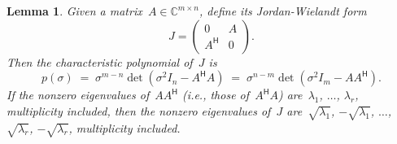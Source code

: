 \documentclass[11pt,a4paper]{article}
\newtheorem{lemma}{Lemma}%
\theoremstyle{definition}
\def\CC{\mathbb{C}}
\newcommand{\hmt}{{\scriptscriptstyle{{\mathsf{H}}}}}
\begin{document}
\begin{lemma}
  \label{lem:lanczos}
  Given a matrix~$A \in \CC^{m\times n}$, define its Jordan-Wielandt form~\cite{Mathias_2013}
\begin{equation}
  \label{eq:JW}
  J = 
  \begin{pmatrix}
    0 & A \\
    A^\hmt & 0
  \end{pmatrix}.
\end{equation}
 Then the characteristic polynomial of~$J$ is
    \begin{equation}
      \label{eq:chp}
      p(\sigma) \;=\; \sigma^{m-n}\det(\sigma^2 I_n - A^\hmt A) \;=\; \sigma^{n-m}\det(\sigma^2 I_m
      - A A^\hmt). 
    \end{equation}
    If the nonzero eigenvalues of~$AA^\hmt$ \textnormal{(}i.e., those of~$A^\hmt A$\textnormal{)}
    are~$\lambda_1$, $\dots$, $\lambda_r$, multiplicity included, then
    the nonzero eigenvalues of~$J$ are~$\sqrt{\lambda_1}$, $-\sqrt{\lambda_1}$, $\dots$, $\sqrt{\lambda_r}$,
    $-\sqrt{\lambda_r}$, multiplicity included.

\end{lemma}
\end{document}
